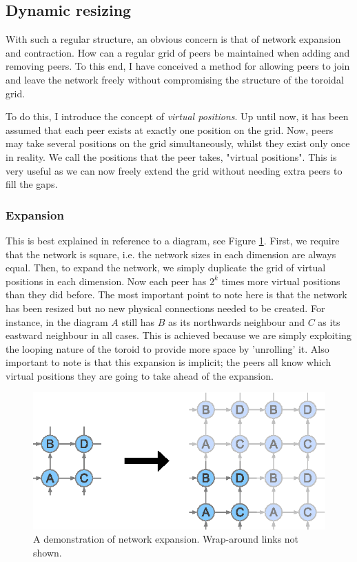 \documentclass[ %
                    author={Luke Murray},
                supervisor={Dr. Simon Hollis},
                     title={Shadow Peer-to-Peer Networks},
                  subtitle={},
                    degree={MEng},
                      year={2013} ]{thesis}
\begin{document}
\subsection{Dynamic resizing}

With such a regular structure, an obvious concern is that of network expansion and contraction. How can a regular grid of peers be maintained when adding and removing peers. To this end, I have conceived a method for allowing peers to join and leave the network freely without compromising the structure of the toroidal grid.

To do this, I introduce the concept of {\em virtual positions}. Up until now, it has been assumed that each peer exists at exactly one position on the grid. Now, peers may take several positions on the grid simultaneously, whilst they exist only once in reality. We call the positions that the peer takes, "virtual positions". This is very useful as we can now freely extend the grid without needing extra peers to fill the gaps.

\subsubsection{Expansion}

This is best explained in reference to a diagram, see Figure \ref{expand}. First, we require that the network is square, i.e. the network sizes in each dimension are always equal. Then, to expand the network, we simply duplicate the grid of virtual positions in each dimension. Now each peer has $2^{k}$ times more virtual positions than they did before. The most important point to note here is that the network has been resized but no new physical connections needed to be created. For instance, in the diagram $A$ still has $B$ as its northwards neighbour and $C$ as its eastward neighbour in all cases. This is achieved because we are simply exploiting the looping nature of the toroid to provide more space by 'unrolling' it. Also important to note is that this expansion is implicit; the peers all know which virtual positions they are going to take ahead of the expansion.

\begin{figure}[h]
    \centering
    \includegraphics{diagrams/network_expand.eps}
    \caption{A demonstration of network expansion. Wrap-around links not shown.}
    \label{expand}
\end{figure}
\end{document}
